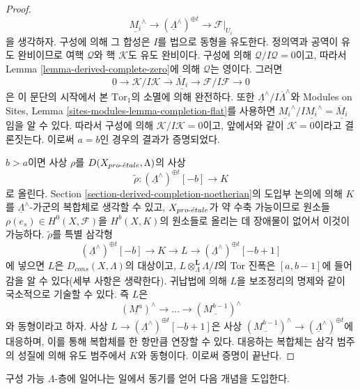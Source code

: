 \begin{proof}
$$\underline{M_i}^\wedge \to
(\underline{\Lambda}^\wedge)^{\oplus t} \to
\mathcal{F}|_{U_i}
$$
을 생각하자. 구성에 의해 그 합성은 $I$를 법으로 동형을 유도한다.
정의역과 공역이 유도 완비이므로 여핵 $\mathcal{Q}$와 핵
$\mathcal{K}$도 유도 완비이다. 구성에 의해
$\mathcal{Q}/I\mathcal{Q} = 0$이고, 따라서 Lemma
\ref{lemma-derived-complete-zero}에 의해 $\mathcal{Q}$는 영이다.
그러면
$$
0 \to \mathcal{K}/I\mathcal{K} \to
\underline{\overline{M}_i}
\to \mathcal{F}/I\mathcal{F} \to 0
$$
은 이 문단의 시작에서 본 $\text{Tor}_1$의 소멸에 의해 완전하다.
또한
$\underline{\Lambda}^\wedge/I\overline{\Lambda}^\wedge$와 Modules on
Sites, Lemma \ref{sites-modules-lemma-completion-flat}를 사용하면
$\underline{M_i}^\wedge/I\underline{M_i}^\wedge =
\underline{\overline{M}_i}$임을 알 수 있다. 따라서 구성에 의해
$\mathcal{K}/I\mathcal{K} = 0$이고, 앞에서와 같이
$\mathcal{K} = 0$이라고 결론짓는다. 이로써 $a = b$인 경우의 결과가
증명되었다.

\medskip\noindent
$b > a$이면 사상 $\rho$를 $D(X_{pro\text{-}\acute{e}tale}, \Lambda)$의 사상
$$
\tilde \rho : (\underline{\Lambda}^\wedge)^{\oplus t}[-b] \longrightarrow K
$$
로 올린다. Section \ref{section-derived-completion-noetherian}의 도입부
논의에 의해 $K$를 $\underline{\Lambda}^\wedge$-가군의 복합체로
생각할 수 있고, $X_{pro\text{-}\acute{e}tale}$가 약 수축 가능이므로 원소들
$\rho(e_s) \in H^0(X, \mathcal{F})$을 $H^b(X, K)$의 원소들로 올리는 데
장애물이 없어서 이것이 가능하다. $\tilde \rho$를 특별 삼각형
$$
(\underline{\Lambda}^\wedge)^{\oplus t}[-b] \to K \to L \to
(\underline{\Lambda}^\wedge)^{\oplus t}[-b + 1]
$$
에 넣으면 $L$은 $D_{cons}(X, \Lambda)$의 대상이고,
$L \otimes_\Lambda^\mathbf{L} \underline{\Lambda/I}$의 Tor 진폭은
$[a, b - 1]$에 들어감을 알 수 있다(세부 사항은 생략한다). 귀납법에
의해 $L$을 보조정리의 명제와 같이 국소적으로 기술할 수 있다. 즉
$L$은
$$
(\underline{M^a})^\wedge \to \ldots \to (\underline{M^{b - 1}})^\wedge
$$
와 동형이라고 하자. 사상
$L \to (\underline{\Lambda}^\wedge)^{\oplus t}[-b + 1]$은 사상
$(\underline{M^{b - 1}})^\wedge \to
(\underline{\Lambda}^\wedge)^{\oplus t}$에 대응하며, 이를 통해
복합체를 한 항만큼 연장할 수 있다. 대응하는 복합체는 삼각 범주의
성질에 의해 유도 범주에서 $K$와 동형이다. 이로써 증명이 끝난다.
\end{proof}

\noindent
구성 가능 $\Lambda$-층에 일어나는 일에서 동기를 얻어 다음 개념을
도입한다.

